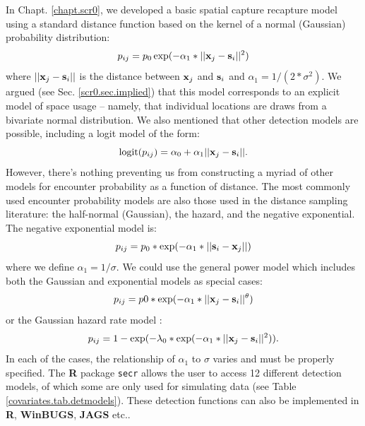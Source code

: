 In Chapt. \ref{chapt.scr0}, we developed a basic spatial capture
recapture model using a standard distance function based on the kernel
of a normal (Gaussian) probability distribution:
\[
p_{ij} = p_{0} \exp(-\alpha_{1} *||{\bf x}_{j}-{\bf s}_{i}||^2)
\]
where $||{\bf x}_{j}-{\bf s}_{i}||$ is the distance between ${\bf
  x}_{j}$ and ${\bf s}_{i}$ and
$\alpha_{1} = 1/(2*\sigma^2)$.
We argued (see Sec. \ref{scr0.sec.implied}) that this model corresponds to
an explicit model of space usage -- namely, that individual locations
are draws from a bivariate normal distribution. We also mentioned that
other detection models are possible, including a logit model of the
form:
\begin{equation}
	\mbox{logit}(p_{ij}) = \alpha_{0} + \alpha_1 ||{\bf x}_{j}-{\bf s}_{i} ||.
\label{covariates.eq.logit}
\end{equation}
However, there's nothing preventing us from constructing a myriad of
other models for encounter probability as a function of distance.
The most
commonly used encounter probability models
 are also those used in the distance
sampling literature: the half-normal (Gaussian), the hazard, and the negative
exponential.  The negative exponential model is: 
\[
p_{ij} = p_{0}*\exp(-\alpha_{1} *||{\bf s}_{i}-{\bf x}_{j}||)
\]
where we define
$\alpha_{1} = 1/\sigma$.
We could use the general power model \citep{russell_etal:2012} which includes both the
Gaussian and exponential models as special cases:
\[
p_{ij} = p0*\exp(-\alpha_{1} *||{\bf x}_{j}-{\bf s}_{i}||^{\theta} )
\]
or the Gaussian hazard rate model \citep{hayes_buckland:1983}:
\[
p_{ij} = 1-\exp(-\lambda_{0}* \exp(-\alpha_{1} *||{\bf x}_{j}-{\bf
  s}_{i}||^{2}) ).
\]
In each of the cases, the relationship of $\alpha_1$ to $\sigma$ varies and must
be properly specified.  The {\bf R} package
{\tt secr} allows the user to access 12 different detection models, of which
some are only used for simulating data (see Table \ref{covariates.tab.detmodels}). These detection
functions can also be implemented in {\bf R}, {\bf WinBUGS},
{\bf JAGS} etc..


